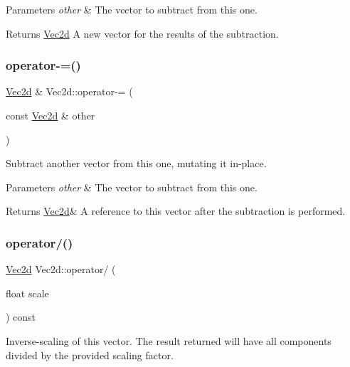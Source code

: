 \begin{DoxyParams}{Parameters}
{\em other} & The vector to subtract from this one. \\
\hline
\end{DoxyParams}
\begin{DoxyReturn}{Returns}
\hyperlink{classVec2d}{Vec2d} A new vector for the results of the subtraction. 
\end{DoxyReturn}
\mbox{\label{classVec2d_a1f9d999b49fd6b464ba452a213de9fdd}} 
\subsubsection{\texorpdfstring{operator-\/=()}{operator-=()}}
{\footnotesize\ttfamily \hyperlink{classVec2d}{Vec2d} \& Vec2d\+::operator-\/= (\begin{DoxyParamCaption}\item[{const \hyperlink{classVec2d}{Vec2d} \&}]{other }\end{DoxyParamCaption})}



Subtract another vector from this one, mutating it in-\/place. 


\begin{DoxyParams}{Parameters}
{\em other} & The vector to subtract from this one. \\
\hline
\end{DoxyParams}
\begin{DoxyReturn}{Returns}
\hyperlink{classVec2d}{Vec2d}\& A reference to this vector after the subtraction is performed. 
\end{DoxyReturn}
\mbox{\label{classVec2d_a5795c07fd4b63ba1a5a8bf69657a625b}} 
\subsubsection{\texorpdfstring{operator/()}{operator/()}}
{\footnotesize\ttfamily \hyperlink{classVec2d}{Vec2d} Vec2d\+::operator/ (\begin{DoxyParamCaption}\item[{float}]{scale }\end{DoxyParamCaption}) const}



Inverse-\/scaling of this vector. The result returned will have all components divided by the provided scaling factor. 


